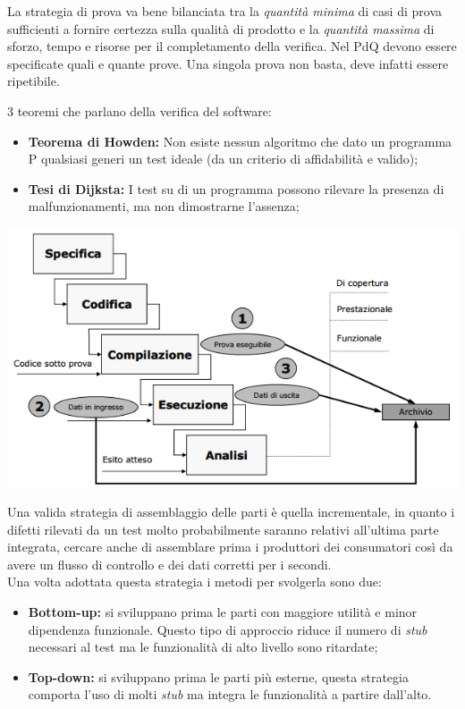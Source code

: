 La strategia di prova va bene bilanciata tra la \textit{quantità minima} di casi di prova sufficienti a fornire certezza sulla qualità di prodotto e la \textit{quantità massima} di sforzo, tempo e risorse per il completamento della verifica. Nel PdQ devono essere specificate quali e quante prove. Una singola prova non basta, deve infatti essere ripetibile.

3 teoremi che parlano della verifica del software:
\begin{itemize}
	\item \textbf{Teorema di Howden:} Non esiste nessun algoritmo che dato un programma P qualsiasi generi un test ideale (da un criterio di affidabilità e valido);
	\item \textbf{Tesi di Dijksta:} I test su di un programma possono rilevare la presenza di malfunzionamenti, ma non dimostrarne l'assenza;
\end{itemize}

\includegraphics[width=0.5\columnwidth]{img7} %

Una valida strategia di assemblaggio delle parti è quella incrementale, in quanto i difetti rilevati da un test molto probabilmente saranno relativi all'ultima parte integrata, cercare anche di assemblare prima i produttori dei consumatori così da avere un flusso di controllo e dei dati corretti per i secondi.\\
Una volta adottata questa strategia i metodi per svolgerla sono due:
\begin{itemize}
	\item \textbf{Bottom-up:} si sviluppano prima le parti con maggiore utilità e minor dipendenza funzionale. Questo tipo di approccio riduce il numero di \textit{stub} necessari al test ma le funzionalità di alto livello sono ritardate;
	\item \textbf{Top-down:} si sviluppano prima le parti più esterne, questa strategia comporta l'uso di molti \textit{stub} ma integra le funzionalità a partire dall'alto.
\end{itemize}

